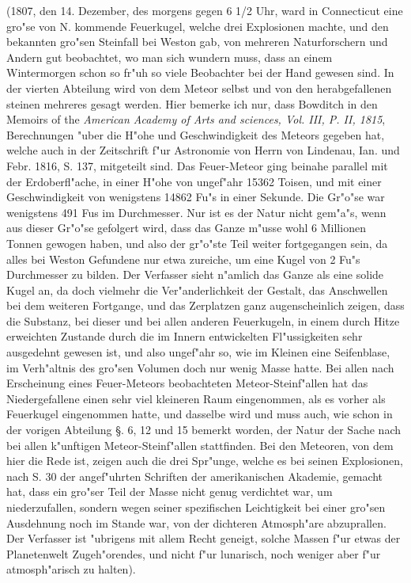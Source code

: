 \documentclass[a4paper, 11pt, oneside, polutonikogreek, german]{article}
\begin{document}
(1807, den 14. Dezember, des morgens gegen 6 1/2 Uhr, ward in Connecticut eine gro"se von N. kommende Feuerkugel, welche drei Explosionen machte, und den bekannten gro"sen Steinfall bei Weston gab, von mehreren Naturforschern und Andern gut beobachtet, wo man sich wundern muss, dass an einem Wintermorgen schon so fr"uh so viele Beobachter bei der Hand gewesen sind. In der vierten Abteilung wird von dem Meteor selbst und von den herabgefallenen steinen mehreres gesagt werden. Hier bemerke ich nur, dass Bowditch in den Memoirs of the \emph{American Academy of Arts and sciences, Vol. III, P. II, 1815}, Berechnungen "uber die H"ohe und Geschwindigkeit des Meteors gegeben hat, welche auch in der Zeitschrift f"ur Astronomie von Herrn von Lindenau, Ian. und Febr. 1816, S. 137, mitgeteilt sind. Das Feuer-Meteor ging beinahe parallel mit der Erdoberfl"ache, in einer H"ohe von ungef"ahr 15362 Toisen, und mit einer Geschwindigkeit von wenigstens 14862 Fu"s in einer Sekunde. Die Gr"o"se war wenigstens 491 Fus im Durchmesser. Nur ist es der Natur nicht gem"a"s, wenn aus dieser Gr"o"se gefolgert wird, dass das Ganze m"usse wohl 6 Millionen Tonnen gewogen haben, und also der gr"o"ste Teil weiter fortgegangen sein, da alles bei Weston Gefundene nur etwa zureiche, um eine Kugel von 2 Fu"s Durchmesser zu bilden. Der Verfasser sieht n"amlich das Ganze als eine solide Kugel an, da doch vielmehr die Ver"anderlichkeit der Gestalt, das Anschwellen bei dem weiteren Fortgange, und das Zerplatzen ganz augenscheinlich zeigen, dass die Substanz, bei dieser und bei allen anderen Feuerkugeln, in einem durch Hitze erweichten Zustande durch die im Innern entwickelten Fl"ussigkeiten sehr ausgedehnt gewesen ist, und also ungef"ahr so, wie im Kleinen eine Seifenblase, im Verh"altnis des gro"sen Volumen doch nur wenig Masse hatte. Bei allen nach Erscheinung eines Feuer-Meteors beobachteten Meteor-Steinf"allen hat das Niedergefallene einen sehr viel kleineren Raum eingenommen, als es vorher als Feuerkugel eingenommen hatte, und dasselbe wird und muss auch, wie schon in der vorigen Abteilung §. 6, 12 und 15 bemerkt worden, der Natur der Sache nach bei allen k"unftigen Meteor-Steinf"allen stattfinden. Bei den Meteoren, von dem hier die Rede ist, zeigen auch die drei Spr"unge, welche es bei seinen Explosionen, nach S. 30 der angef"uhrten Schriften der amerikanischen Akademie, gemacht hat, dass ein gro"ser Teil der Masse nicht genug verdichtet war, um niederzufallen, sondern wegen seiner spezifischen Leichtigkeit bei einer gro"sen Ausdehnung noch im Stande war, von der dichteren Atmosph"are abzuprallen. Der Verfasser ist "ubrigens mit allem Recht geneigt, solche Massen f"ur etwas der Planetenwelt Zugeh"orendes, und nicht f"ur lunarisch, noch weniger aber f"ur atmosph"arisch zu halten).
\end{document}
